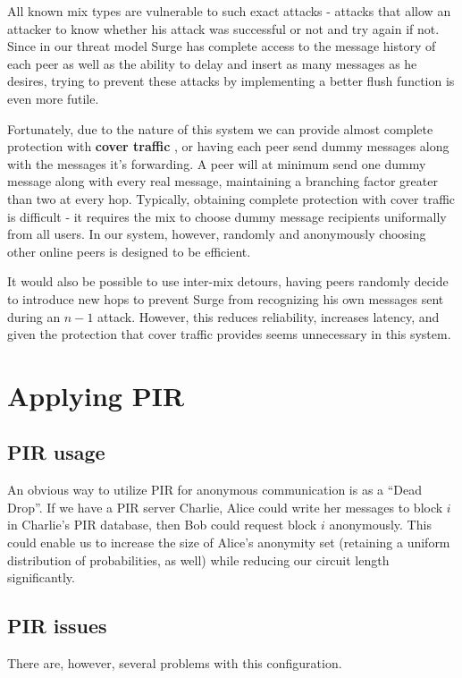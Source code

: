 \documentclass[twocolumn,11pt,english]{article}
\begin{document}
All known mix types are vulnerable to such exact attacks \cite{trickle02} -  attacks that allow an attacker to know whether his attack was successful or not and try again if not. Since in our threat model Surge has complete access to the message history of each peer as well as the ability to delay and insert as many messages as he desires, trying to prevent these attacks by implementing a better flush function is even more futile. 

Fortunately, due to the nature of this system we can provide almost complete protection with \textbf{cover traffic} \cite{trickle02}, or having each peer send dummy messages along with the messages it's forwarding. A peer will at minimum send one dummy message along with every real message, maintaining a branching factor greater than two at every hop. Typically, obtaining complete protection with cover traffic is difficult - it requires the mix to choose dummy message recipients uniformally from all users\cite{trickle02}. In our system, however, randomly and anonymously choosing other online peers is designed to be efficient.

It would also be possible to use inter-mix detours\cite{TODO}, having peers randomly decide to introduce new hops to prevent Surge from recognizing his own messages sent during an $n - 1$ attack. However, this reduces reliability, increases latency, and given the protection that cover traffic provides seems unnecessary in this system. 

\section{Applying PIR}
\subsection{PIR usage}
An obvious way to utilize PIR for anonymous communication is as a ``Dead Drop''. If we have a PIR server Charlie, Alice could write her messages to block $i$ in Charlie's PIR database, then Bob could request block $i$ anonymously. This could enable us to increase the size of Alice's anonymity set (retaining a uniform distribution of probabilities, as well) while reducing our circuit length significantly. 

\subsection{PIR issues}
There are, however, several problems with this configuration.
\end{document}
